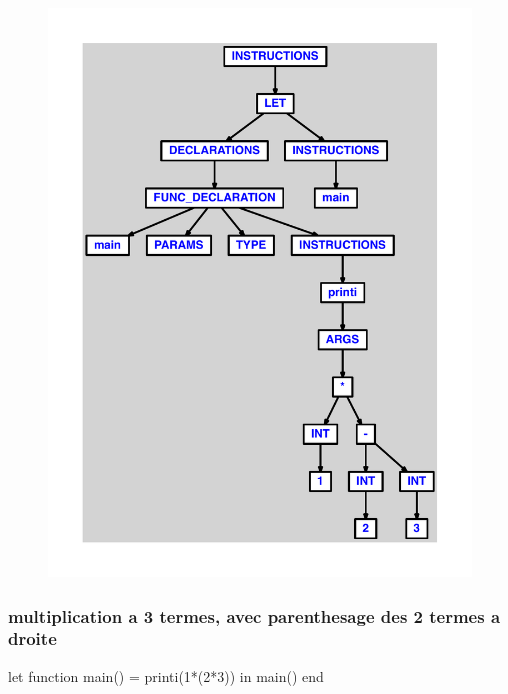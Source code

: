 \documentclass{article}
\begin{document}
\begin{figure}[H]\centering\includegraphics[max width=\textwidth]{ast/ast_92.pdf}\end{figure}\subsubsection{multiplication a 3 termes, avec parenthesage des 2 termes a droite}
\begin{verbatimtab}
let function main() = printi(1*(2*3)) in main() end
\end{verbatimtab}
\end{document}
